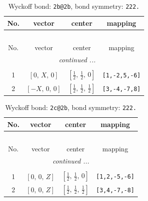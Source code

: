 \documentclass[fleqn,8pt]{jsarticle}
\begin{document}
\renewcommand{\arraystretch}{1.2}
\begin{longtable}{cccc}
\caption{Wyckoff bond: {\tt 2b@2b}, bond symmetry: {\tt 222.}}
 \\
 \hline \hline
No. & vector & center & mapping \\ \hline \endfirsthead

\multicolumn{3}{l}{\tablename\ \thetable{}} \\
 \hline \hline
No. & vector & center & mapping \\ \hline \endhead

 \hline \hline
\multicolumn{3}{r}{\footnotesize\it continued ...} \\ \endfoot

 \hline \hline
\multicolumn{3}{r}{} \\ \endlastfoot

1 & $\left[ 0,\, X,\, 0 \right]$ & $\left[ \frac{1}{2},\, \frac{1}{2},\, 0 \right]$ & {\tt [1,-2,5,-6]} \\ \hline
2 & $\left[ - X,\, 0,\, 0 \right]$ & $\left[ \frac{1}{2},\, \frac{1}{2},\, \frac{1}{2} \right]$ & {\tt [3,-4,-7,8]} \\
\end{longtable}
\renewcommand{\arraystretch}{1.2}
\begin{longtable}{cccc}
\caption{Wyckoff bond: {\tt 2c@2b}, bond symmetry: {\tt 222.}}
 \\
 \hline \hline
No. & vector & center & mapping \\ \hline \endfirsthead

\multicolumn{3}{l}{\tablename\ \thetable{}} \\
 \hline \hline
No. & vector & center & mapping \\ \hline \endhead

 \hline \hline
\multicolumn{3}{r}{\footnotesize\it continued ...} \\ \endfoot

 \hline \hline
\multicolumn{3}{r}{} \\ \endlastfoot

1 & $\left[ 0,\, 0,\, Z \right]$ & $\left[ \frac{1}{2},\, \frac{1}{2},\, 0 \right]$ & {\tt [1,2,-5,-6]} \\ \hline
2 & $\left[ 0,\, 0,\, Z \right]$ & $\left[ \frac{1}{2},\, \frac{1}{2},\, \frac{1}{2} \right]$ & {\tt [3,4,-7,-8]} \\
\end{longtable}
\renewcommand{\arraystretch}{1.2}
\end{document}
